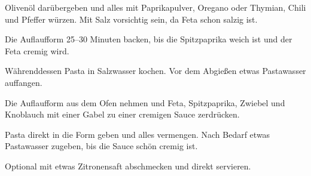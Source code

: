 \begin{recipe}
{    \step%
    Olivenöl darübergeben und alles mit Paprikapulver, Oregano oder Thymian, Chili und Pfeffer würzen. Mit Salz vorsichtig sein, da Feta schon salzig ist.
    
    \step%
    Die Auflaufform 25--30 Minuten backen, bis die Spitzpaprika weich ist und der Feta cremig wird.
    
    \step%
    Währenddessen Pasta in Salzwasser kochen. Vor dem Abgießen etwas Pastawasser auffangen.
    
    \step%
    Die Auflaufform aus dem Ofen nehmen und Feta, Spitzpaprika, Zwiebel und Knoblauch mit einer Gabel zu einer cremigen Sauce zerdrücken.
    
    \step%
    Pasta direkt in die Form geben und alles vermengen. Nach Bedarf etwas Pastawasser zugeben, bis die Sauce schön cremig ist.
    
    \step%
    Optional mit etwas Zitronensaft abschmecken und direkt servieren.
}



\end{recipe}